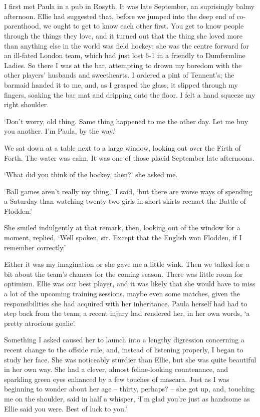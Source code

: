 \section{}

I first met Paula in a pub in Rosyth. It was late September, an suprisingly balmy afternoon. Ellie had suggested that, before we jumped into the deep end of co-parenthood, we ought to get to know each other first. You get to know people through the things they love, and it turned out that the thing she loved more than anything else in the world was field hockey; she was the centre forward for an ill-fated London team, which had just lost 6-1 in a friendly to Dumfermline Ladies. So there I was at the bar, attempting to drown my boredom with the other players' husbands and sweethearts. I ordered a pint of Tennent's; the barmaid handed it to me, and, as I grasped the glass, it slipped through my fingers, soaking the bar mat and dripping onto the floor. I felt a hand squeeze my right shoulder.

`Don't worry, old thing. Same thing happened to me the other day. Let me buy you another. I'm Paula, by the way.'

We sat down at a table next to a large window, looking out over the Firth of Forth. The water was calm. It was one of those placid September late afternoons.

`What did you think of the hockey, then?' she asked me.

`Ball games aren't really my thing,' I said, `but there are worse ways of spending a Saturday than watching twenty-two girls in short skirts reenact the Battle of Flodden.'

She smiled indulgently at that remark, then, looking out of the window for a moment, replied, `Well spoken, sir. Except that the English won Flodden, if I remember correctly.'

Either it was my imagination or she gave me a little wink. Then we talked for a bit about the team's chances for the coming season. There was little room for optimism. Ellie was our best player, and it was likely that she would have to miss a lot of the upcoming training sessions, maybe even some matches, given the responsibilities she had acquired with her inheritance. Paula herself had had to step back from the team; a recent injury had rendered her, in her own words, `a pretty atrocious goalie'.

Something I asked caused her to launch into a lengthy digression concerning a recent change to the offside rule, and, instead of listening properly, I began to study her face. She was noticeably sturdier than Ellie, but she was quite beautiful in her own way. She had a clever, almost feline-looking countenance, and sparkling green eyes enhanced by a few touches of mascara. Just as I was beginning to wonder about her age -- thirty, perhaps? -- she got up, and, touching me on the shoulder, said in half a whisper, `I'm glad you're just as handsome as Ellie said you were. Best of luck to you.'

